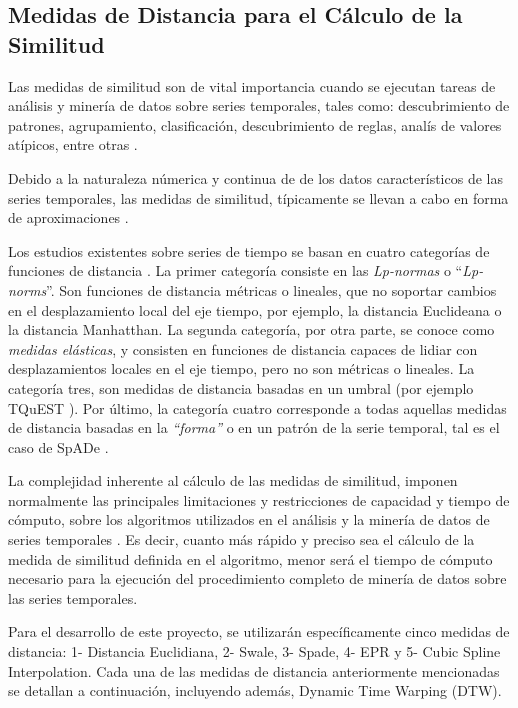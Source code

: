 \subsection{Medidas de Distancia para el C\'alculo de la Similitud}
Las medidas de similitud son de vital importancia cuando se ejecutan tareas de an\'alisis y miner\'ia de datos sobre series temporales, tales como: descubrimiento de patrones, agrupamiento, clasificaci\'on, descubrimiento de reglas, anal\'is de valores at\'ipicos, entre otras \cite{concepts}.\par
Debido a la naturaleza n\'umerica y continua de de los datos caracter\'isticos de las series temporales, las medidas de similitud, t\'ipicamente se llevan a cabo en forma de aproximaciones \cite{distancecomparison}.\par
Los estudios existentes sobre series de tiempo se basan en cuatro categor\'ias de funciones de distancia \cite{measurements}. La primer categor\'ia consiste en las \textit{Lp-normas} o \enquote{\textit{Lp-norms}}. Son funciones de distancia m\'etricas o lineales, que no soportar cambios en el desplazamiento local del eje tiempo, por ejemplo, la distancia Euclideana o la distancia Manhatthan. La segunda categor\'ia, por otra parte, se conoce como \textit{medidas el\'asticas}, y consisten en funciones de distancia capaces de lidiar con desplazamientos locales en el eje tiempo, pero no son m\'etricas o lineales. La categor\'ia tres, son medidas de distancia basadas en un umbral (por ejemplo TQuEST \cite{distancecomparison}). Por \'ultimo, la categor\'ia cuatro corresponde a todas aquellas medidas de distancia basadas en la \textit{\enquote{forma}} o en un patr\'on de la serie temporal, tal es el caso de SpADe \cite{spade}. \par
La complejidad inherente al c\'alculo de las medidas de similitud, imponen normalmente las principales limitaciones y restricciones de capacidad y tiempo de c\'omputo, sobre los algoritmos utilizados en el an\'alisis y la miner\'ia de datos de series temporales \cite{algoanalysis}. Es decir, cuanto m\'as r\'apido y preciso sea el c\'alculo de la medida de similitud definida en el algoritmo, menor ser\'a el tiempo de c\'omputo necesario para la ejecuci\'on del procedimiento completo de miner\'ia de datos sobre las series temporales.\par
Para el desarrollo de este proyecto, se utilizar\'an espec\'ificamente cinco medidas de distancia: 1- Distancia Euclidiana, 2- Swale, 3- Spade, 4- EPR y 5- Cubic Spline Interpolation. Cada una de las medidas de distancia anteriormente mencionadas se detallan a continuaci\'on, incluyendo adem\'as, Dynamic Time Warping (DTW).
